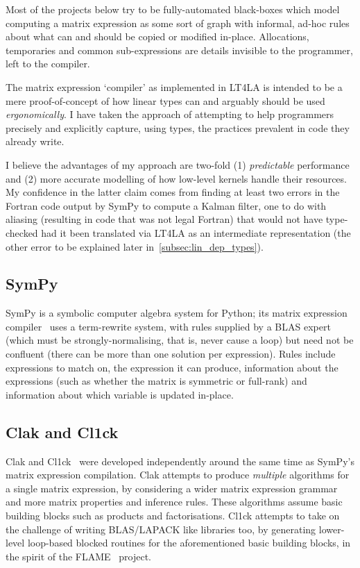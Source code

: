 Most of the projects below try to be fully-automated black-boxes which model
computing a matrix expression as some sort of graph with informal, ad-hoc rules
about what can and should be copied or modified in-place. Allocations,
temporaries and common sub-expressions are details invisible to the programmer,
left to the compiler.

The matrix expression `compiler' as implemented in LT4LA is intended to be a
mere proof-of-concept of how linear types can and arguably should be used
\emph{ergonomically}. I have taken the approach of attempting to help
programmers precisely and explicitly capture, using types, the practices
prevalent in code they already write.

I believe the advantages of my approach are two-fold (1) \emph{predictable}
performance and (2) more accurate modelling of how low-level kernels handle
their resources. My confidence in the latter claim comes from finding at least
two errors in the Fortran code output by SymPy to compute a Kalman filter, one
to do with aliasing (resulting in code that was not legal Fortran) that would
not have type-checked had it been translated via LT4LA as an intermediate
representation (the other error to be explained later
in~\ref{subsec:lin_dep_types}).

\subsection{SymPy}

SymPy is a symbolic computer algebra system for Python; its matrix expression
compiler~\cite{rocklin_thesis} uses a term-rewrite system, with rules supplied
by a BLAS expert (which must be strongly-normalising, that is, never cause a
loop) but need not be confluent (there can be more than one solution per
expression). Rules include expressions to match on, the expression it can
produce, information about the expressions (such as whether the matrix is
symmetric or full-rank) and information about which variable is updated
in-place.

\subsection{Clak and Cl1ck}

Clak and Cl1ck~\cite{fabregat_thesis} were developed independently around the
same time as SymPy's matrix expression compilation. Clak attempts to produce
\emph{multiple} algorithms for a single matrix expression, by considering a
wider matrix expression grammar and more matrix properties and inference rules.
These algorithms assume basic building blocks such as products and
factorisations. Cl1ck attempts to take on the challenge of writing BLAS/LAPACK
like libraries too, by generating lower-level loop-based blocked routines for
the aforementioned basic building blocks, in the spirit of the
FLAME~\cite{gunnels_flame} project.

